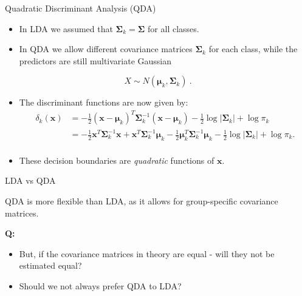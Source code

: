 \documentclass[10pt,ignorenonframetext,]{beamer}
\providecommand{\tightlist}{%
  \setlength{\itemsep}{0pt}\setlength{\parskip}{0pt}}
\begin{document}
\begin{frame}{Quadratic Discriminant Analysis (QDA)}
\protect\hypertarget{quadratic-discriminant-analysis-qda}{}

\begin{itemize}
\item
  In LDA we assumed that \(\boldsymbol{\Sigma}_k = \boldsymbol{\Sigma}\)
  for all classes.
\item
  In QDA we allow different covariance matrices
  \(\boldsymbol{\Sigma}_k\) for each class, while the predictors are
  still multivariate Gaussian
\end{itemize}

\[X \sim N(\boldsymbol{\mu}_k, \boldsymbol{\Sigma}_k) \ .\]

\begin{itemize}
\item
  The discriminant functions are now given by: \vspace{-3mm}
  \begin{align*} \delta_k({\boldsymbol x}) &= -\frac{1}{2}({\boldsymbol x}-\boldsymbol{\mu}_k)^T \boldsymbol{\Sigma}_k^{-1}({\boldsymbol x}-\boldsymbol{\mu}_k)-\frac{1}{2}\log |\boldsymbol{\Sigma}_k| + \log \pi_k \\ 
  &= -\frac{1}{2} {\boldsymbol x}^T \boldsymbol{\Sigma}_k^{-1}{\boldsymbol x} + {\boldsymbol x}^T \boldsymbol{\Sigma}_k^{-1}\boldsymbol{\mu}_k - \frac{1}{2} \boldsymbol{\mu}_k^T \boldsymbol{\Sigma}_k^{-1}\boldsymbol{\mu}_k - \frac{1}{2}\log |\boldsymbol{\Sigma}_k | + \log \pi_k.\\
  \end{align*}
\item
  These decision boundaries are \emph{quadratic} functions of
  \({\boldsymbol x}\).
\end{itemize}

\end{frame}

\begin{frame}

\begin{block}{LDA vs QDA}

\vspace{2mm}

QDA is more flexible than LDA, as it allows for group-specific
covariance matrices.

\vspace{4mm}

\textbf{Q:}

\begin{itemize}
\tightlist
\item
  But, if the covariance matrices in theory are equal - will they not be
  estimated equal?
\item
  Should we not always prefer QDA to LDA?
\end{itemize}

\end{block}

\end{frame}
\end{document}

